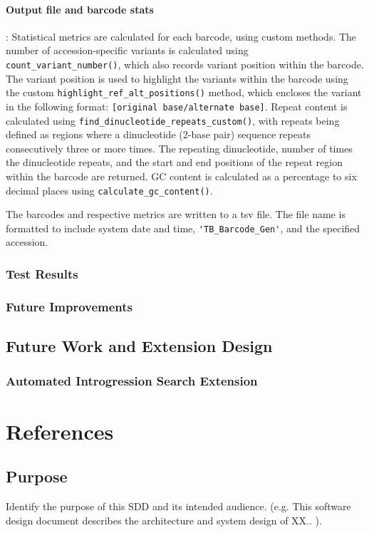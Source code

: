 \documentclass[12pt]{article}
\begin{document}
\paragraph{Output file and barcode stats}: 
Statistical metrics are calculated for each barcode, using custom methods. The number of accession-specific variants is calculated using \verb+count_variant_number()+, which also records variant position within the barcode. The variant position is used to highlight the variants within the barcode using the custom \verb+highlight_ref_alt_positions()+ method, which encloses the variant in the following format: \verb+[original base/alternate base]+. Repeat content is calculated using \verb+find_dinucleotide_repeats_custom()+, with repeats being defined as regions where a dinucleotide (2-base pair) sequence repeats consecutively three or more times. The repeating dinucleotide, number of times the dinucleotide repeats, and the start and end positions of the repeat region within the barcode are returned. GC content is calculated as a percentage to six decimal places using \verb+calculate_gc_content()+. 

The barcodes and respective metrics are written to a tsv file. The file name is formatted to include system date and time, \verb+'TB_Barcode_Gen'+, and the specified accession. 

\subsubsection{Test Results}
\subsubsection{Future Improvements}
\subsection{Future Work and Extension Design}
\subsubsection{Automated Introgression Search Extension}
\section{References}

\subsection{Purpose}
Identify the purpose of this SDD and its intended audience. (e.g. This software design
document describes the architecture and system design of XX.. ).
\end{document}
